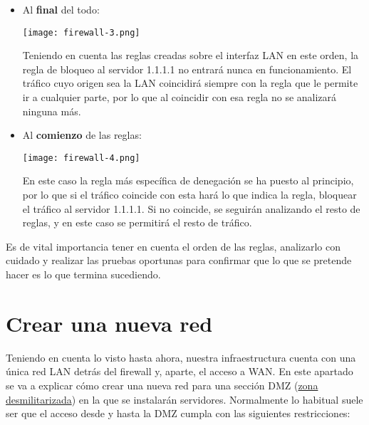 \begin{itemize}
    \item Al \textbf{final} del todo:
    \begin{center}
        \texttt{[image: firewall-3.png]}
    \end{center}
    Teniendo en cuenta las reglas creadas sobre el interfaz LAN en este orden, la regla de bloqueo al servidor 1.1.1.1 no entrará nunca en funcionamiento. El tráfico cuyo origen sea la LAN coincidirá siempre con la regla que le permite ir a cualquier parte, por lo que al coincidir con esa regla no se analizará ninguna más.

    \item Al \textbf{comienzo} de las reglas:
    \begin{center}
        \texttt{[image: firewall-4.png]}
    \end{center}
    En este caso la regla más específica de denegación se ha puesto al principio, por lo que si el tráfico coincide con esta hará lo que indica la regla, bloquear el tráfico al servidor 1.1.1.1. Si no coincide, se seguirán analizando el resto de reglas, y en este caso se permitirá el resto de tráfico.
\end{itemize}

Es de vital importancia tener en cuenta el orden de las reglas, analizarlo con cuidado y realizar las pruebas oportunas para confirmar que lo que se pretende hacer es lo que termina sucediendo.


\hypertarget{crear_una_nueva_red}{}
\chapter{Crear una nueva red}

Teniendo en cuenta lo visto hasta ahora, nuestra infraestructura cuenta con una única red LAN detrás del firewall y, aparte, el acceso a WAN. En este apartado se va a explicar cómo crear una nueva red para una sección DMZ (\href{https://es.wikipedia.org/wiki/Zona_desmilitarizada_(inform%C3%A1tica)}{zona desmilitarizada}) en la que se instalarán servidores.
Normalmente lo habitual suele ser que el acceso desde y hasta la DMZ cumpla con las siguientes restricciones:

